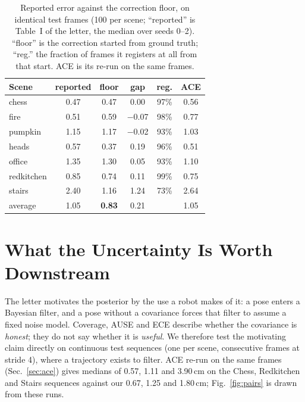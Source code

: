 \documentclass[journal]{IEEEtran}
\begin{document}
\begin{table}[t]
\caption{Reported error against the correction floor, on identical test
frames (100 per scene; ``reported'' is Table~I of the letter, the median over seeds 0--2). ``floor'' is the correction started from ground truth; ``reg.'' the fraction of frames it registers at all from that start.
ACE is its re-run on the same frames.}
\label{tab:headroom}
\centering\footnotesize
\setlength{\tabcolsep}{4pt}
\begin{tabular}{@{}lccccc@{}}
\toprule
Scene & reported & floor & gap & reg. & ACE \\
\midrule
chess      & 0.47 & 0.47 & 0.00 & 97\% & 0.56 \\
fire       & 0.51 & 0.59 & $-$0.07 & 98\% & 0.77 \\
pumpkin    & 1.15 & 1.17 & $-$0.02 & 93\% & 1.03 \\
heads      & 0.57 & 0.37 & 0.19 & 96\% & 0.51 \\
office     & 1.35 & 1.30 & 0.05 & 93\% & 1.10 \\
redkitchen & 0.85 & 0.74 & 0.11 & 99\% & 0.75 \\
stairs     & 2.40 & 1.16 & 1.24 & 73\% & 2.64 \\
\midrule
average    & 1.05 & \textbf{0.83} & 0.21 & & 1.05 \\
\bottomrule
\end{tabular}
\end{table}

\section{What the Uncertainty Is Worth Downstream}
\label{sec:benefit}
The letter motivates the posterior by the use a robot makes of it: a pose
enters a Bayesian filter, and a pose without a covariance forces that filter
to assume a fixed noise model. Coverage, AUSE and ECE describe whether the
covariance is \emph{honest}; they do not say whether it is \emph{useful}. We
therefore test the motivating claim directly on continuous test sequences
(one per scene, consecutive frames at stride 4), where a trajectory exists to
filter. ACE re-run on the same frames (Sec.~\ref{sec:ace}) gives medians of 0.57, 1.11 and 3.90\,cm on the Chess, Redkitchen and Stairs sequences against our 0.67, 1.25 and 1.80\,cm; Fig.~\ref{fig:pairs} is drawn from these runs.
\end{document}
